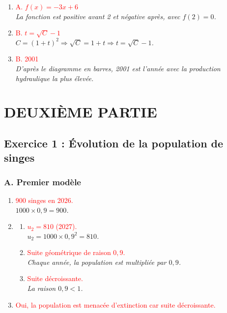 \documentclass[11pt,a4paper]{article}
\newcommand{\reponse}[1]{\textcolor{red}{#1}}
\begin{document}
\begin{enumerate}
    \item \reponse{A. $f(x) = -3x + 6$} \\
    \textit{La fonction est positive avant 2 et négative après, avec $f(2) = 0$.}

    \item \reponse{B. $t = \sqrt{C} - 1$} \\
    \textit{$C = (1 + t)^2 \Rightarrow \sqrt{C} = 1 + t \Rightarrow t = \sqrt{C} - 1$.}

    \item \reponse{B. 2001} \\
    \textit{D'après le diagramme en barres, 2001 est l'année avec la production hydraulique la plus élevée.}
\end{enumerate}

\section*{DEUXIÈME PARTIE}

\subsection*{Exercice 1 : Évolution de la population de singes}

\subsubsection*{A. Premier modèle}
\begin{enumerate}
    \item \reponse{900 singes en 2026.} \\
    \textit{$1000 \times 0,9 = 900$.}

    \item
    \begin{enumerate}
        \item \reponse{$u_2 = 810$ (2027).} \\
        \textit{$u_2 = 1000 \times 0,9^2 = 810$.}

        \item \reponse{Suite géométrique de raison $0,9$.} \\
        \textit{Chaque année, la population est multipliée par $0,9$.}

        \item \reponse{Suite décroissante.} \\
        \textit{La raison $0,9 < 1$.}
    \end{enumerate}

    \item \reponse{Oui, la population est menacée d'extinction car suite décroissante.}
\end{enumerate}
\end{document}

